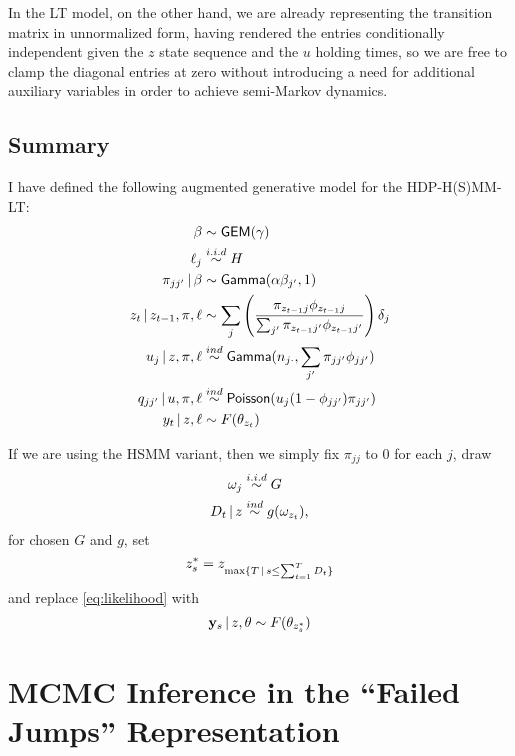 In the LT model, on the other hand, we are already representing the
transition matrix in unnormalized form, having rendered the entries
conditionally independent given the $z$ state sequence and the $u$ holding times,
so we are free to clamp the diagonal entries at zero without
introducing a need for additional auxiliary variables 
in order to achieve semi-Markov dynamics.

\subsection{Summary}
\label{sec:model-summary}

I have defined the following augmented generative model for the
HDP-H(S)MM-LT:
\begin{align}
  \label{eq:96}
  \beta &\sim \mathsf{GEM}(\gamma) \\
  \ell_j &\stackrel{i.i.d}{\sim} H \\
  \pi_{jj'} \, \vert \, \beta &\sim \mathsf{Gamma}(\alpha \beta_{j'},1)
  \\
  z_{t} \, \vert \, z_{t-1}, \pi, \ell &\sim \sum_{j}
  \left(\frac{\pi_{z_{t-1}j}\phi_{z_{t-1}j}}{\sum_{j'}
    \pi_{z_{t-1}j'}\phi_{z_{t-1}j'}}\right)\delta_j \\
  u_j \, \vert \, z, \pi, \ell &\stackrel{ind}{\sim}
  \mathsf{Gamma}(n_{j\cdot},\sum_{j'} \pi_{jj'}\phi_{jj'}) \\
  q_{jj'} \, \vert \, u, \pi, \ell &\stackrel{ind}{\sim}
  \mathsf{Poisson}(u_j(1 - \phi_{jj'})\pi_{jj'}) \\
  \label{eq:likelihood} y_t \, \vert \, z, \ell &\sim F(\theta_{z_t})
\end{align}

If we are using the HSMM variant, then we simply fix $\pi_{jj}$ to 0
for each $j$, draw
\begin{align}
  \label{eq:97}
  \omega_j &\stackrel{i.i.d}{\sim} G \\
  D_t \, \vert \, z &\stackrel{ind}{\sim} g(\omega_{z_t}),
\end{align}
for chosen $G$ and $g$, set
\begin{equation}
  \label{eq:98}
  z^*_s = z_{\max\{T \, \vert \, s \leq \sum_{t=1}^T D_t\}}
\end{equation}
and replace \eqref{eq:likelihood} with
\begin{equation}
  \label{eq:likelihood-hsmm} \mathbf{y}_s \, \vert \, z, \theta \sim F(\theta_{z^*_s})
\end{equation}

\section{MCMC Inference in the ``Failed Jumps'' Representation}
\label{sec:inference}

